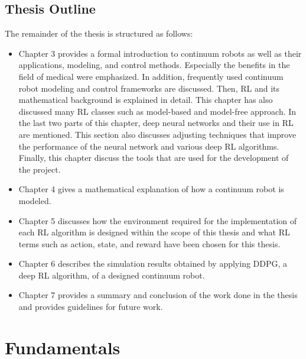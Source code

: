 \documentclass[12pt,twoside,a4]{mwbk}
\begin{document}
\section{Thesis Outline}
The remainder of the thesis is structured as follows:
\begin{itemize}

\item Chapter 3 provides a formal introduction to continuum robots as well as their applications, modeling, and control methods. Especially the benefits in the field of medical were emphasized. In addition, frequently used continuum robot modeling and control frameworks are discussed. Then, RL and its mathematical background is explained in detail. This chapter has also discussed many RL classes such as model-based and model-free approach. In the last two parts of this chapter, deep neural networks and their use in RL are mentioned. This section also discusses adjusting techniques that improve the performance of the neural network and various deep RL algorithms. Finally, this chapter discuss the tools that are used for the development of the project.

\item Chapter 4 gives a mathematical explanation of how a continuum robot is modeled.

\item Chapter 5 discusses how the environment required for the implementation of each RL algorithm is designed within the scope of this thesis and what RL terms such as action, state, and reward have been chosen for this thesis.

\item Chapter 6 describes the simulation results obtained by applying DDPG, a deep RL algorithm, of a designed continuum robot.

\item Chapter 7 provides a summary and conclusion of the work done in the thesis and provides guidelines for future work.

\end{itemize}

\chapter{Fundamentals}
\end{document}
